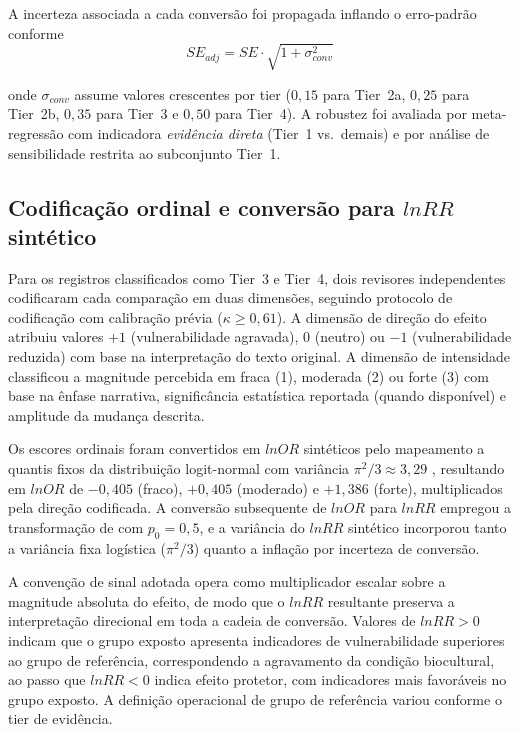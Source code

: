 \documentclass[12pt,a4paper]{article}
\begin{document}
A incerteza associada a cada conversão foi propagada inflando o erro-padrão conforme
%
\begin{equation}
SE_{adj} = SE \cdot \sqrt{1 + \sigma^2_{conv}}
\label{eq:se-adj}
\end{equation}

\noindent onde $\sigma_{conv}$ assume valores crescentes por tier ($0{,}15$ para Tier~2a, $0{,}25$ para Tier~2b, $0{,}35$ para Tier~3 e $0{,}50$ para Tier~4). A robustez foi avaliada por meta-regressão com indicadora \textit{evidência direta} (Tier~1 vs.~demais) e por análise de sensibilidade restrita ao subconjunto Tier~1.

\subsection{Codificação ordinal e conversão para $lnRR$ sintético}
\label{sec:coding}

Para os registros classificados como Tier~3 e Tier~4, dois revisores independentes codificaram cada comparação em duas dimensões, seguindo protocolo de codificação com calibração prévia ($\kappa \geq 0{,}61$). A dimensão de direção do efeito atribuiu valores $+1$ (vulnerabilidade agravada), $0$ (neutro) ou $-1$ (vulnerabilidade reduzida) com base na interpretação do texto original. A dimensão de intensidade classificou a magnitude percebida em fraca (1), moderada (2) ou forte (3) com base na ênfase narrativa, significância estatística reportada (quando disponível) e amplitude da mudança descrita.

Os escores ordinais foram convertidos em $lnOR$ sintéticos pelo mapeamento a quantis fixos da distribuição logit-normal com variância $\pi^2/3 \approx 3{,}29$ \citep{Hasselblad1995}, resultando em $lnOR$ de $-0{,}405$ (fraco), $+0{,}405$ (moderado) e $+1{,}386$ (forte), multiplicados pela direção codificada. A conversão subsequente de $lnOR$ para $lnRR$ empregou a transformação de \citet{Zhang1998} com $p_0 = 0{,}5$, e a variância do $lnRR$ sintético incorporou tanto a variância fixa logística ($\pi^2/3$) quanto a inflação por incerteza de conversão.

A convenção de sinal adotada opera como multiplicador escalar sobre a magnitude absoluta do efeito, de modo que o $lnRR$ resultante preserva a interpretação direcional em toda a cadeia de conversão. Valores de $lnRR > 0$ indicam que o grupo exposto apresenta indicadores de vulnerabilidade superiores ao grupo de referência, correspondendo a agravamento da condição biocultural, ao passo que $lnRR < 0$ indica efeito protetor, com indicadores mais favoráveis no grupo exposto. A definição operacional de grupo de referência variou conforme o tier de evidência. 
\end{document}
